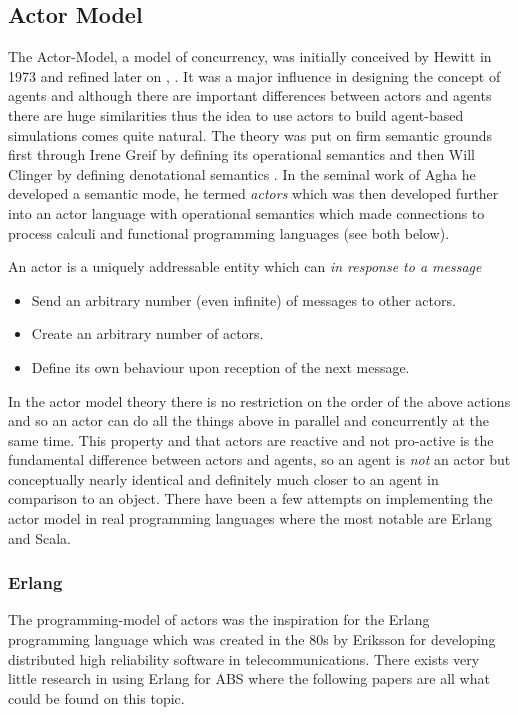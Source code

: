 \subsection{Actor Model}
The Actor-Model, a model of concurrency, was initially conceived by Hewitt in 1973 \cite{hewitt_universal_1973} and refined later on \cite{hewitt_what_2007}, \cite{hewitt_actor_2010}. It was a major influence in designing the concept of agents and although there are important differences between actors and agents there are huge similarities thus the idea to use actors to build agent-based simulations comes quite natural. The theory was put on firm semantic grounds first through Irene Greif by defining its operational semantics \cite{greif_semantics_1975} and then Will Clinger by defining denotational semantics \cite{clinger_foundations_1981}. In the seminal work of Agha \cite{agha_actors:_1986} he developed a semantic mode, he termed \textit{actors} which was then developed further \cite{agha_foundation_1997} into an actor language with operational semantics which made connections to process calculi and functional programming languages (see both below). 

An actor is a uniquely addressable entity which can \textit{in response to a message}
\begin{itemize}
	\item Send an arbitrary number (even infinite) of messages to other actors.
	\item Create an arbitrary number of actors.
	\item Define its own behaviour upon reception of the next message.
\end{itemize}

In the actor model theory there is no restriction on the order of the above actions and so an actor can do all the things above in parallel and concurrently at the same time. This property and that actors are reactive and not pro-active is the fundamental difference between actors and agents, so an agent is \textit{not} an actor but conceptually nearly identical and definitely much closer to an agent in comparison to an object. There have been a few attempts on implementing the actor model in real programming languages where the most notable are Erlang and Scala.

\subsubsection{Erlang}
The programming-model of actors \cite{agha_actors:_1986} was the inspiration for the Erlang programming language which was created in the 80s by Eriksson for developing distributed high reliability software in telecommunications. There exists very little research in using Erlang for ABS where the following papers are all what could be found on this topic.

